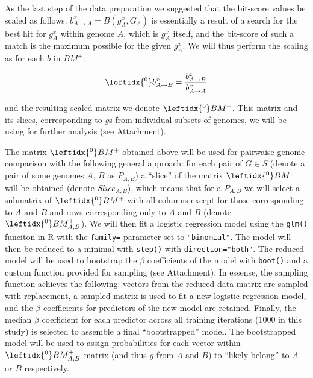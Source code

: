 As the last step of the data preparation we suggested that the bit-score values be
scaled as follows. $b_{A \rightarrow A}^x = B(g_A^x, G_A)$ is essentially a
result of a search for the best hit for $g_A^x$ within genome $A$, which is
$g_A^x$ itself, and the bit-score of such a match is the maximum possible for
the given $g_A^x$. We will thus perform the scaling as for each $b$ in $BM^+$:

\begin{equation}
\leftidx{^0}b_{A \rightarrow B}^x = \dfrac{b_{A \rightarrow B}^x}{b_{A \rightarrow
A}^x}
\end{equation}

\newcommand{\bmzp}{\leftidx{^0}BM^+}

and the resulting scaled matrix we denote $\leftidx{^0}BM^+$. This matrix and
its slices, corresponding to $g$s from individual subsets of genomes, we will
be using for further analysis (see Attachment).

The matrix $\bmzp{}$ obtained above will be used for pairwaise genome
comparison with the following general approach:
for each pair of $G \in S$ (denote a pair of some genomes $A$, $B$ as
$P_{A,B}$) a ``slice'' of the matrix $\bmzp{}$
will be obtained (denote $Slice_{A,B}$), which means that for a $P_{A,B}$ we
will select a submatrix of $\bmzp{}$ with all columns except for those
corresponding to $A$ and $B$ and rows corresponding only to $A$ and $B$ (denote
$\leftidx{^0}BM_{A,B}^+$).
\newcommand{\bmzpab}{\leftidx{^0}BM_{A,B}^+}
We will then fit a logistic regression model using the {\tt glm{()}} funciton
in R with the {\tt family=} parameter set to {\tt "binomial"}. The model will
then be reduced to a minimal with {\tt step()} with {\tt direction="both"}. The
reduced model will be used to bootstrap the $\beta$ coefficients of the model
with {\tt boot()} and a custom function provided for sampling (see Attachment).
In essense, the sampling function achieves the following: vectors from the
reduced data matrix are sampled with replacement, a sampled matrix is used to
fit a new logistic regression model, and the $\beta$ coefficients for
predictors of the new model are retained. Finally, the median $\beta$
coefficient for each predictor across all training iterations (1000 in this
study) is selected to assemble a final ``bootstrapped''
model. The bootstrapped model will be used to assign probabilities for each
vector within $\bmzpab$ matrix (and thus $g$ from $A$ and $B$) to ``likely
belong'' to $A$ or $B$ respectively.

